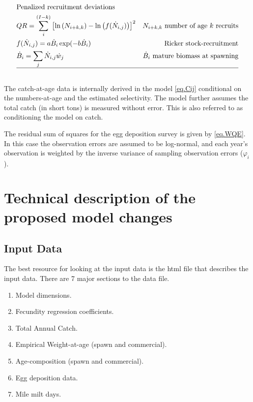 \documentclass[12pt,letterpaper]{article}
\newcounter{saveEq}
\def\getEq{\setcounter{equation}{\value{saveEq}}}
\def\normalEq{ %
    \getEq
    \renewcommand{\theequation}{\arabic{section}.\arabic{equation}}}
\begin{document}
\begin{table}[ht]
\begin{align}
        &\mbox{Penalized recruitment deviations} \nonumber \\
        & QR = \sum_{i}^{(I-k)} \left[  \ln\left(N_{i+k,k}\right) 
        - \ln\left(f(\dot{N}_{i,j}) \right) \right]^2 
          & \mbox{$N_{i+k,k}$ number of age $k$ recruits}\\
        & f(\dot{N}_{i,j}) = a \dot{B}_i \exp(-b \dot{B}_i) &\mbox{Ricker stock-recruitment}\\
        & \dot{B}_i = \sum_j \dot{N}_{i,j} \dot{w}_j &\mbox{$\dot{B}_i$ mature biomass at spawning} \\
        \hline \nonumber
      \end{align}
      \normalEq
    \end{table}
    The catch-at-age data is internally derived in the model \eqref{eq.Cij} conditional on the numbers-at-age and the estimated selectivity. The model further assumes the total catch (in short tons) is measured without error.  This is also referred to as conditioning the model on catch.

    The residual sum of squares for the egg deposition survey is given by \eqref{eq.WQE}.  In this case the observation errors are assumed to be log-normal, and each year's observation is weighted by the inverse variance of sampling observation errors ($\varphi_i$).




  \clearpage
  \section{Technical description of the proposed model changes} %
  \label{sec:methods}
  
  \subsection{Input Data} %
  \label{sub:input_data}
    The best resource for looking at the input data is the html file that describes the input data. There are 7 major sections to the data file.
    \begin{enumerate}
      \item Model dimensions.
      \item Fecundity regression coefficients.
      \item Total Annual Catch.
      \item Empirical Weight-at-age (spawn and commercial).
      \item Age-composition (spawn and commercial).
      \item Egg deposition data.
      \item Mile milt days.
    \end{enumerate}
\end{document}
